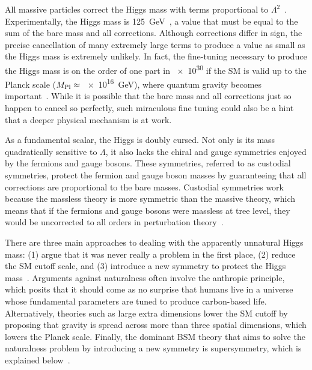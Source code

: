 \documentclass[12pt]{article}
\begin{document}
    All massive particles correct the Higgs mass with terms proportional to $\Lambda^2$~\cite{dine_naturalness}. Experimentally, the Higgs mass is \SI{125}{\giga\electronvolt}~\cite{cms_higgs, atlas_higgs}, a value that must be equal to the sum of the bare mass and all corrections. Although corrections differ in sign, the precise cancellation of many extremely large terms to produce a value as small as the Higgs mass is extremely unlikely. In fact, the fine-tuning necessary to produce the Higgs mass is on the order of one part in \num{e30} if the SM is valid up to the Planck scale ($M_{\mathrm{Pl}}\approx$ \SI{e16}{\giga\electronvolt}), where quantum gravity becomes important~\cite{giudice_naturally}. While it is possible that the bare mass and all corrections just so happen to cancel so perfectly, such miraculous fine tuning could also be a hint that a deeper physical mechanism is at work.

    As a fundamental scalar, the Higgs is doubly cursed. Not only is its mass quadratically sensitive to $\Lambda$, it also lacks the chiral and gauge symmetries enjoyed by the fermions and gauge bosons. These symmetries, referred to as custodial symmetries, protect the fermion and gauge boson masses by guaranteeing that all corrections are proportional to the bare masses. Custodial symmetries work because the massless theory is more symmetric than the massive theory, which means that if the fermions and gauge bosons were massless at tree level, they would be uncorrected to all orders in perturbation theory~\cite{giudice_naturally}.

    There are three main approaches to dealing with the apparently unnatural Higgs mass: (1) argue that it was never really a problem in the first place, (2) reduce the SM cutoff scale, and (3) introduce a new symmetry to protect the Higgs mass~\cite{craig}. Arguments against naturalness often involve the anthropic principle, which posits that it should come as no surprise that humans live in a universe whose fundamental parameters are tuned to produce carbon-based life. Alternatively, theories such as large extra dimensions lower the SM cutoff by proposing that gravity is spread across more than three spatial dimensions, which lowers the Planck scale. Finally, the dominant BSM theory that aims to solve the naturalness problem by introducing a new symmetry is supersymmetry, which is explained below~\cite{dine_naturalness}.
    
\end{document}
